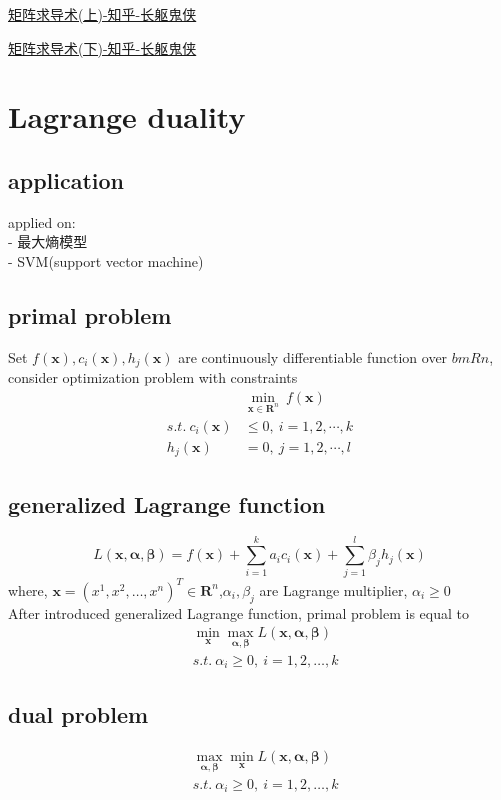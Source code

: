 \documentclass[UTF8]{ctexart}
\begin{document}
	\href{https://zhuanlan.zhihu.com/p/24709748}{矩阵求导术(上)-知乎-长躯鬼侠}

	\href{https://zhuanlan.zhihu.com/p/24863977}{矩阵求导术(下)-知乎-长躯鬼侠}


\section{Lagrange duality}
	\subsection{application}
		applied on:\\
		- 最大熵模型\\
		- SVM(support vector machine)
	\subsection{primal problem}
		Set $f(\bm x),c_{i}(\bm x),h_{j}(\bm x)$ are continuously differentiable function over $bm R{n}$, consider optimization problem with constraints
		\begin{equation*}
		\begin{split}
		&\min_{\bm x\in \bm R^{n}}\ f(\bm x) \\
		s.t.\  c_{i}(\bm x)&\leq0, \ i=1,2,\cdots,k\\
		h_{j}(\bm x)&=0, \ j=1,2,\cdots,l
		\end{split}
		\end{equation*}
	\subsection{generalized Lagrange function}
		$$
		L(\bm x,\bm\alpha,\bm\beta)=f(\bm x)+\sum\limits_{i=1}^{k}a_{i}c_{i}(\bm x)+\sum\limits_{j=1}^{l}\beta_{j}h_{j}(\bm x)
		$$
		where, $\bm x=(x^{1},x^{2},\dots,x^{n})^{T}\in\bm R^{n}$,$\alpha_{i},\beta_{j}$ are Lagrange multiplier, $\alpha_{i}\geq0$ \\
		After introduced generalized Lagrange function, primal problem is equal to 
		\begin{equation*}
		\begin{split}
		&\min\limits_{\bm x}\max\limits_{\bm \alpha, \bm \beta}L(\bm x,\bm\alpha,\bm\beta)\\
		&s.t.\ \alpha_{i}\geq0, \ i=1,2,\dots,k
		\end{split}
		\end{equation*}

	\subsection{dual problem}
		\begin{equation*}
		\begin{split}
		&\max\limits_{\bm\alpha,\bm\beta}\min\limits_{\bm x}L(\bm x,\bm\alpha,\bm\beta)\\
		&s.t.\ \alpha_{i}\geq0, \ i=1,2,\dots,k
		\end{split}
		\end{equation*}
\end{document}
